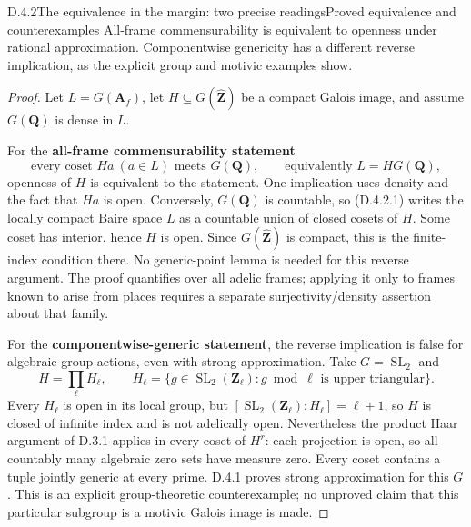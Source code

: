 \begin{result}{D.4.2}{The equivalence in the margin: two precise readings}{Proved equivalence and counterexamples}
All-frame commensurability is equivalent to openness under rational approximation. Componentwise genericity has a different reverse implication, as the explicit group and motivic examples show.
\end{result}
\begin{proof}
Let \(L=G(\mathbf A_f)\), let \(H\subseteq G(\widehat{\mathbf Z})\)
be a compact Galois image, and assume \(G(\mathbf Q)\) is dense in
\(L\).

For the \textbf{all-frame commensurability statement}
\[
\text{every coset }Ha\ (a\in L)\text{ meets }G(\mathbf Q),
\qquad\text{equivalently }L=H G(\mathbf Q),
\tag{D.4.2.1}
\]
openness of \(H\) is equivalent to the statement. One implication
uses density and the fact that \(Ha\) is open. Conversely,
\(G(\mathbf Q)\) is countable, so (D.4.2.1) writes the locally
compact Baire space \(L\) as a countable union of closed cosets of
\(H\). Some coset has interior, hence \(H\) is open. Since
\(G(\widehat{\mathbf Z})\) is compact, this is the finite-index
condition there. No generic-point lemma is needed for this reverse
argument. The proof quantifies over all adelic frames; applying it
only to frames known to arise from places requires a separate
surjectivity/density assertion about that family.

For the \textbf{componentwise-generic statement}, the reverse implication
is false for algebraic group actions, even with strong approximation.
Take \(G=\operatorname{SL}_2\) and
\[
H=\prod_\ell H_\ell,\qquad
H_\ell=\{g\in\operatorname{SL}_2(\mathbf Z_\ell):
g\bmod\ell\text{ is upper triangular}\}.
\]
Every \(H_\ell\) is open in its local group, but
\([\operatorname{SL}_2(\mathbf Z_\ell):H_\ell]=\ell+1\), so \(H\)
is closed of infinite index and is not adelically open. Nevertheless
the product Haar argument of D.3.1 applies in every coset of
\(H^r\): each projection is open, so all countably many algebraic
zero sets have measure zero. Every coset contains a tuple jointly
generic at every prime. D.4.1 proves strong approximation for this
\(G\). This is an explicit group-theoretic counterexample; no
unproved claim that this particular subgroup is a motivic Galois
image is made.


\end{proof}
